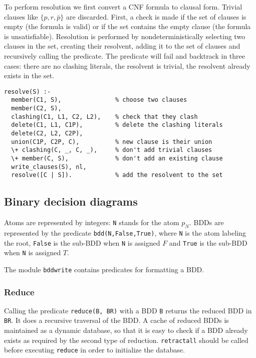 \documentclass[11pt]{article}
\newcommand*{\p}[1]{\textup{\texttt{#1}}}
\begin{document}
To perform resolution we first convert a CNF formula to clausal form.
Trivial clauses like $\{p,r,\bar{p}\}$ are discarded. First, a check is
made if the set of clauses is empty (the formula is valid) or if the set
contains the empty clause (the formula is unsatisfiable). Resolution is
performed by nondeterministically selecting two clauses in the set,
creating their resolvent, adding it to the set of clauses and
recursively calling the predicate. The predicate will fail and backtrack
in three cases: there are no clashing literals, the resolvent is
trivial, the resolvent already exists in the set.

\begin{verbatim}
resolve(S) :-
  member(C1, S),               % choose two clauses
  member(C2, S),               
  clashing(C1, L1, C2, L2),    % check that they clash
  delete(C1, L1, C1P),         % delete the clashing literals
  delete(C2, L2, C2P),         
  union(C1P, C2P, C),          % new clause is their union
  \+ clashing(C, _, C, _),     % don't add trivial clauses
  \+ member(C, S),             % don't add an existing clause
  write_clauses(S), nl,        
  resolve([C | S]).            % add the resolvent to the set
\end{verbatim}


\subsection{Binary decision diagrams}\label{s.bdd}

Atoms are represented by integers: \p{N} stands for the atom $p_{N}$.
BDDs are represented by the predicate \p{bdd(N,False,True)}, where \p{N}
is the atom labeling the root, \p{False} is the sub-BDD when \p{N} is
assigned $F$ and \p{True} is the sub-BDD when \p{N} is assigned $T$.

The module \p{bddwrite} contains predicates for formatting a BDD.

\subsubsection{Reduce}

Calling the predicate \p{reduce(B, BR)} with a BDD \p{B} returns the
reduced BDD in \p{BR}. It does a recursive traversal of the BDD. A cache
of reduced BDDs is maintained as a dynamic database, so that it is easy
to check if a BDD already exists as required by the second type of
reduction. \p{retractall} should be called before executing \p{reduce}
in order to initialize the database.
\end{document}
